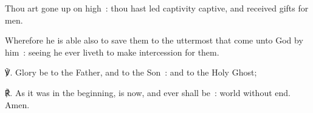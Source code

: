 Thou art gone up on high~: thou hast led captivity captive, and received gifts for men. 

Wherefore he is able also to save them to the uttermost that come unto God by him~: seeing he ever liveth to make intercession for them. 

℣. Glory be to the Father, and to the Son~: and to the Holy Ghost;\par
℟. As it was in the beginning, is now, and ever shall be~: world without end. Amen.\\



